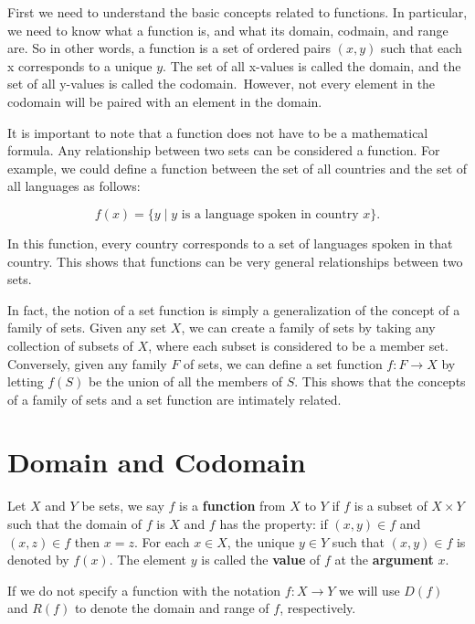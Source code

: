 \documentclass[
  letterpaper,
  10pt,
  reqno,
  twopage,
  openany]{book}
\theoremstyle{plain}
\theoremstyle{definition}
\theoremstyle{definition}
\theoremstyle{definition}
\theoremstyle{plain}
\theoremstyle{plain}
\theoremstyle{remark}
\begin{document}
First we need to understand the basic concepts related to functions. In
particular, we need to know what a function is, and what its domain,
codmain, and range are. So in other words, a function is a set of
ordered pairs \((x, y)\) such that each x corresponds to a unique \(y.\)
The set of all x-values is called the domain, and the set of all
y-values is called the codomain.~However, not every element in the
codomain will be paired with an element in the domain.~

It is important to note that a function does not have to be a
mathematical formula. Any relationship between two sets can be
considered a function. For example, we could define a function between
the set of all countries and the set of all languages as follows:

\[
f(x) = \{y \mid y \text{ is a language spoken in country } x\}.
\]

In this function, every country corresponds to a set of languages spoken
in that country. This shows that functions can be very general
relationships between two sets.

In fact, the notion of a set function is simply a generalization of the
concept of a family of sets. Given any set \(X\), we can create a family
of sets by taking any collection of subsets of \(X\), where each subset
is considered to be a member set. Conversely, given any family \(F\) of
sets, we can define a set function \(f : F \to X\) by letting \(f(S)\)
be the union of all the members of \(S\). This shows that the concepts
of a family of sets and a set function are intimately related.

\hypertarget{domain-and-codomain}{%
\section{Domain and Codomain}\label{domain-and-codomain}}

Let \(X\) and \(Y\) be sets, we say \(f\) is a 
\textbf{function} from \(X\) to \(Y\) if \(f\) is a subset of
\(X\times Y\) such that the domain of \(f\) is \(X\) and \(f\) has the
property: if \((x,y)\in f\) and \((x,z)\in f\) then \(x=z\). For each
\(x\in X\), the unique \(y\in Y\) such that \((x,y)\in f\) is denoted by
\(f(x)\). The element \(y\) is called the  \textbf{value}
of \(f\) at the  \textbf{argument} \(x\).

If we do not specify a function with the notation \(f:X\to Y\) we will
use \(D(f)\) and \(R(f)\) to denote the domain and range of \(f\),
respectively.
\end{document}
